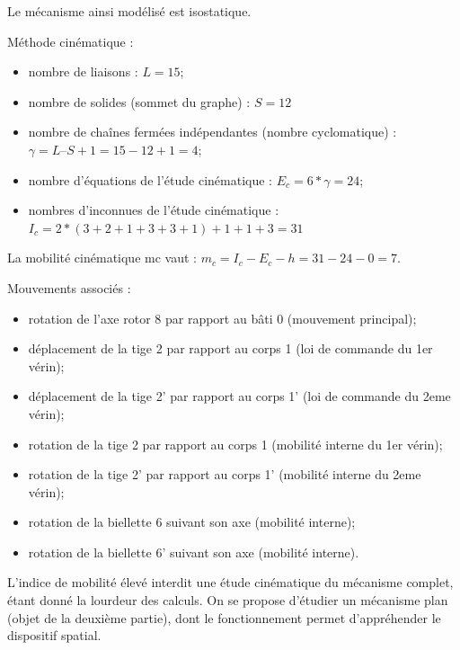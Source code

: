 Le mécanisme ainsi modélisé est isostatique.

\ifprof
\begin{corrige}
Méthode cinématique : 
\begin{itemize}
\item nombre de liaisons  : $L = 15$;
\item nombre de solides (sommet du graphe) : $S = 12$
\item nombre de chaînes fermées indépendantes (nombre cyclomatique)  : $\gamma = L – S + 1=15-12+1=4$;
\item nombre d’équations de l’étude cinématique : $E_c = 6* \gamma  = 24$;
\item nombres d’inconnues de l’étude cinématique : $I_c = 2*(3+2+1+3+3+1)+1+1+3=31$
\end{itemize}

La mobilité cinématique mc vaut : $m_c =  I_c- E_c - h = 31 -24 -0 = 7$.

Mouvements associés :
\begin{itemize}
\item rotation de l’axe rotor 8 par rapport au bâti 0 (mouvement principal);
\item déplacement de la tige 2 par rapport au corps 1 (loi de commande du 1er vérin);
\item déplacement de la tige 2’ par rapport au corps 1’ (loi de commande du 2eme vérin);
\item rotation de la tige 2 par rapport au corps 1 (mobilité interne du 1er vérin);
\item rotation de la tige 2’ par rapport au corps 1’ (mobilité interne du 2eme vérin);
\item rotation de la biellette  6 suivant son axe (mobilité interne);
\item rotation de la biellette  6’ suivant son axe (mobilité interne).
\end{itemize}
\end{corrige}
\else
\fi

\ifprof
\else
\begin{rem}
L’indice de mobilité élevé interdit une étude cinématique du mécanisme complet, étant donné la lourdeur des calculs. On se propose d’étudier un mécanisme plan (objet de la deuxième partie), dont le fonctionnement permet d’appréhender le dispositif spatial. 
\end{rem}
\fi
